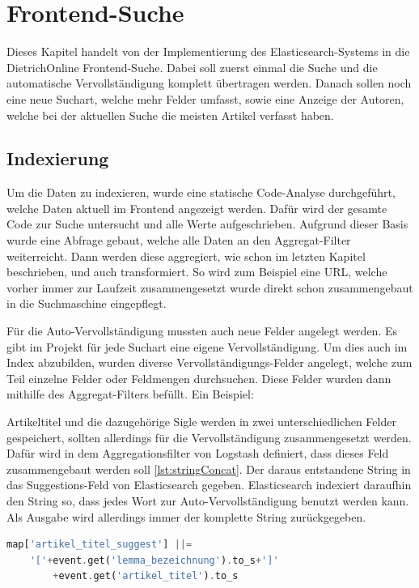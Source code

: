 \chapter{Frontend-Suche}

Dieses Kapitel handelt von der Implementierung des Elasticsearch-Systems in die DietrichOnline Frontend-Suche. Dabei soll zuerst einmal die Suche und die automatische Vervollständigung komplett übertragen werden. Danach sollen noch eine neue Suchart, welche mehr Felder umfasst, sowie eine Anzeige der Autoren, welche bei der aktuellen Suche die meisten Artikel verfasst haben.

\section{Indexierung}

Um die Daten zu indexieren, wurde eine statische Code-Analyse durchgeführt, welche Daten aktuell im Frontend angezeigt werden. Dafür wird der gesamte Code zur Suche untersucht und alle Werte aufgeschrieben. Aufgrund dieser Basis wurde eine Abfrage gebaut, welche alle Daten an den Aggregat-Filter weiterreicht. Dann werden diese aggregiert, wie schon im letzten Kapitel beschrieben, und auch transformiert. So wird zum Beispiel eine URL, welche vorher immer zur Laufzeit zusammengesetzt wurde direkt schon zusammengebaut in die Suchmaschine eingepflegt. 

Für die Auto-Vervollständigung mussten auch neue Felder angelegt werden. Es gibt im Projekt für jede Suchart eine eigene Vervollständigung. Um dies auch im Index abzubilden, wurden diverse Vervollständigungs-Felder angelegt, welche zum Teil einzelne Felder oder Feldmengen durchsuchen. Diese Felder wurden dann mithilfe des Aggregat-Filters befüllt. Ein Beispiel:

Artikeltitel und die dazugehörige Sigle werden in zwei unterschiedlichen Felder gespeichert, sollten allerdings für die Vervollständigung zusammengesetzt werden.
Dafür wird in dem Aggregationsfilter von Logstash definiert, dass dieses Feld zusammengebaut werden soll \ref{lst:stringConcat}. Der daraus entstandene String in das Suggestions-Feld von Elasticsearch gegeben. Elasticsearch indexiert daraufhin den String so, dass jedes Wort zur Auto-Vervollständigung benutzt werden kann. Als Ausgabe wird allerdings immer der komplette String zurückgegeben.

\begin{lstlisting}[language=PHP, frame=single, label={lst:stringConcat}, caption=String-Konkatination im Aggregat Filter von Logstash ,captionpos=b] 
map['artikel_titel_suggest'] ||= 
    '['+event.get('lemma_bezeichnung').to_s+']'
        +event.get('artikel_titel').to_s
\end{lstlisting}

